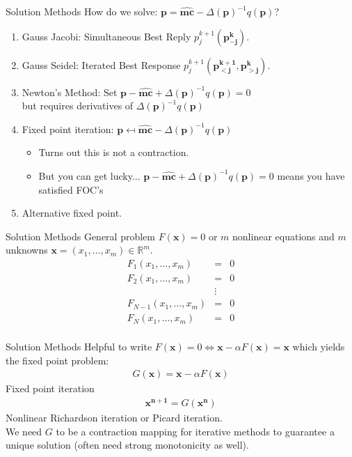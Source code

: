 \documentclass[aspectratio=169,10pt]{beamer}
\begin{document}
\begin{frame}{Solution Methods}
How do we solve: $\symbf{p} = \widehat{\symbf{mc}} - \Delta(\symbf{p})^{-1}q(\symbf{p})$?
\begin{enumerate}
\item Gauss Jacobi: Simultaneous Best Reply  $p_j^{k+1}(\symbf{p_{-j}^k})$.
\item Gauss Seidel: Iterated Best Response  $p_j^{k+1}(\symbf{p_{<j}^{k+1}},\symbf{p_{>j}^{k}})$.
\item Newton's Method: Set $\symbf{p} - \widehat{\symbf{mc}} + \Delta(\symbf{p})^{-1}q(\symbf{p})=0$\\ but requires derivatives of $\Delta(\symbf{p})^{-1}q(\symbf{p})$
\item Fixed point iteration: $\symbf{p} \mapsfrom \widehat{\symbf{mc}} - \Delta(\symbf{p})^{-1}q(\symbf{p})$
\begin{itemize}
\item Turns out this is \alert{not a contraction}.
\item But you can get lucky... $\symbf{p} - \widehat{\symbf{mc}} + \Delta(\symbf{p})^{-1}q(\symbf{p})=0$ means you have satisfied FOC's
\end{itemize}
\item Alternative fixed point.
\end{enumerate}
\end{frame} 


\begin{frame}{Solution Methods}
\vspace{0.5cm}
General problem $F(\symbf{x}) = 0$ or $m$ nonlinear equations and $m$ unknowns $\symbf{x} = (x_1,\ldots, x_m) \in \mathbb{R}^m$.
\begin{eqnarray*}
F_1 (x_1,\ldots, x_m)  &=& 0 \\
F_2 (x_1,\ldots, x_m)  &=& 0\\
&\vdots&\\ 
F_{N-1} (x_1,\ldots, x_m)  &=& 0\\
F_N (x_1,\ldots, x_m)  &=& 0\\
\end{eqnarray*}
\end{frame} 

\begin{frame}{Solution Methods}
Helpful to write $F(\symbf{x}) = 0 \Leftrightarrow \symbf{x} - \alpha F(\symbf{x}) = \symbf{x}$ which yields the fixed point problem:
\begin{eqnarray*}
G(\symbf{x}) = \symbf{x} -\alpha F(\symbf{x})
\end{eqnarray*}
Fixed point iteration
\begin{eqnarray*}
\symbf{x^{n+1}} = G(\symbf{x^n})
\end{eqnarray*}
Nonlinear Richardson iteration or Picard iteration.\\
\vspace{0.5cm}
We need $G$ to be a \alert{contraction mapping} for iterative methods to guarantee a unique solution (often need strong monotonicity as well).
\end{frame} 
\end{document}
